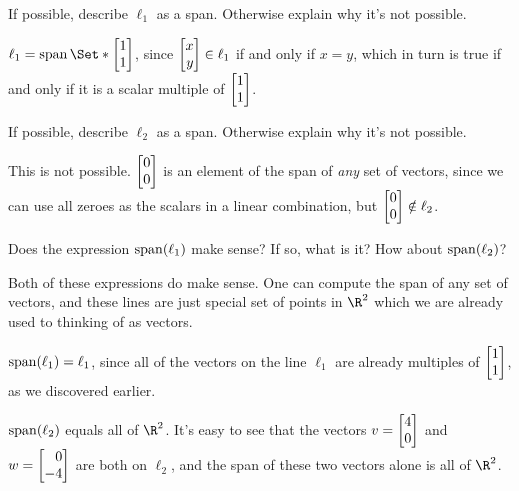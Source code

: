 \documentclass{problemset}
\newcommand{\bookonlynewpage}{\begin{bookonly}\newpage\end{bookonly}}
\begin{document}
	\begin{parts}
		\item If possible, describe $\ell_1$ as a span. Otherwise explain why
			it's not possible.
			\begin{solution}
				$\ell_1 = \Span\Set*{\mat{1\\1}}$, since $\mat{x\\y} \in \ell_1$
				if and only if $x = y$, which in turn is true if and only if it
				is a scalar multiple of $\mat{1\\1}$.
			\end{solution}
		\item If possible, describe $\ell_2$ as a span. Otherwise explain why it's
			not possible.
			\label{linesAsSpans.2}
			\begin{solution}
				This is not possible. $\mat{0\\0}$ is an element of	the span of
				\emph{any} set of vectors, since we can use all zeroes as the
				scalars in a linear combination, but $\mat{0\\0} \notin \ell_2$.
			\end{solution}
		\item Does the expression $\operatorname{span}(\ell_1)$ make sense? If so, what is it?
			How about $\operatorname{span}(\ell_2)$?
			\begin{solution}
				Both of these expressions do make sense. One can compute the span
				of any set of vectors, and these lines are just special set of
				points in $\R^2$ which we are already used to thinking of as vectors.

				$\operatorname{span}(\ell_1) = \ell_1$, since all of the vectors on
				the line $\ell_1$ are already multiples of $\mat{1\\1}$, as we
				discovered earlier.

				$\operatorname{span}(\ell_2)$ equals all of $\R^2$. It's easy to see that the
				vectors $v = \mat{4\\0}$ and $w = \mat{0\\-4}$ are both on $\ell_2$,
				and the span of these two vectors alone is all of $\R^2$.
			\end{solution}
	\end{parts}


	\bookonlynewpage
\end{document}
